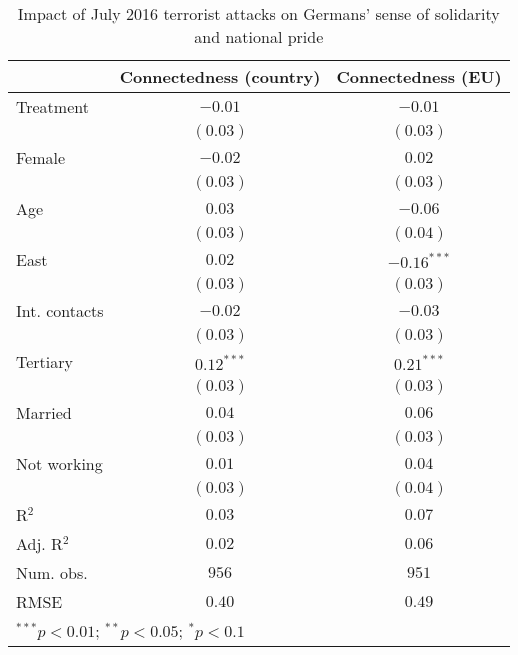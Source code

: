 
\begin{table}
\caption{Impact of July 2016 terrorist attacks on Germans' sense of solidarity and national pride}
\begin{center}
\begin{tabular}{l c c}
\toprule
 & Connectedness (country) & Connectedness (EU) \\
\midrule
Treatment     & $-0.01$      & $-0.01$       \\
              & $(0.03)$     & $(0.03)$      \\
Female        & $-0.02$      & $0.02$        \\
              & $(0.03)$     & $(0.03)$      \\
Age           & $0.03$       & $-0.06$       \\
              & $(0.03)$     & $(0.04)$      \\
East          & $0.02$       & $-0.16^{***}$ \\
              & $(0.03)$     & $(0.03)$      \\
Int. contacts & $-0.02$      & $-0.03$       \\
              & $(0.03)$     & $(0.03)$      \\
Tertiary      & $0.12^{***}$ & $0.21^{***}$  \\
              & $(0.03)$     & $(0.03)$      \\
Married       & $0.04$       & $0.06$        \\
              & $(0.03)$     & $(0.03)$      \\
Not working   & $0.01$       & $0.04$        \\
              & $(0.03)$     & $(0.04)$      \\
\midrule
R$^2$         & $0.03$       & $0.07$        \\
Adj. R$^2$    & $0.02$       & $0.06$        \\
Num. obs.     & $956$        & $951$         \\
RMSE          & $0.40$       & $0.49$        \\
\bottomrule
\multicolumn{3}{l}{\scriptsize{$^{***}p<0.01$; $^{**}p<0.05$; $^{*}p<0.1$}}
\end{tabular}
\label{tab_soli}
\end{center}
\end{table}
